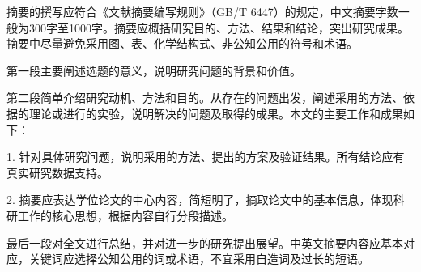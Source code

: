 \begin{cnabstract}
摘要的撰写应符合《文献摘要编写规则》（GB/T 6447）的规定，中文摘要字数一般为300字至1000字。摘要应概括研究目的、方法、结果和结论，突出研究成果。摘要中尽量避免采用图、表、化学结构式、非公知公用的符号和术语。

第一段主要阐述选题的意义，说明研究问题的背景和价值。

第二段简单介绍研究动机、方法和目的。从存在的问题出发，阐述采用的方法、依据的理论或进行的实验，说明解决的问题及取得的成果。本文的主要工作和成果如下：

1. 针对具体研究问题，说明采用的方法、提出的方案及验证结果。所有结论应有真实研究数据支持。

2. 摘要应表达学位论文的中心内容，简短明了，摘取论文中的基本信息，体现科研工作的核心思想，根据内容自行分段描述。

最后一段对全文进行总结，并对进一步的研究提出展望。中英文摘要内容应基本对应，关键词应选择公知公用的词或术语，不宜采用自造词及过长的短语。
\end{cnabstract}
